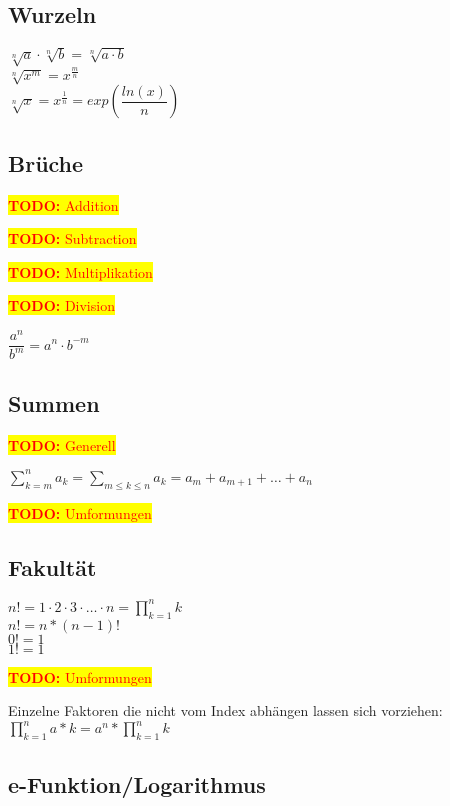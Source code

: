 \documentclass[10pt,a4paper]{article}
\newcommand{\todo}[1]{\begin{flushleft} \colorbox{yellow}{\textcolor{red}{\textbf{TODO:} {#1}}}\end{flushleft} }
\begin{document}
\subsection{Wurzeln}

$\sqrt[n]{a} \cdot \sqrt[n]{b} = \sqrt[n]{a \cdot b}  $ \\
$\sqrt[n]{x^{m}} = x^{\frac{m}{n}}  $ \\
$\sqrt[n]{x} = x^{\frac{1}{n}} = exp(\dfrac{ln(x)}{n})$

\subsection{Brüche}

\todo{Addition}
\todo{Subtraction}
\todo{Multiplikation}
\todo{Division}

$ \dfrac{a^{n}}{b^{m}} = a^{n} \cdot b^{-m}$

\subsection{Summen}

\todo{Generell}

$ \sum_{k=m}^{n}a_k = \sum_{m \leq k \leq n}a_k = a_m + a_{m+1} + \dots + a_n $

\todo{Umformungen}


\subsection{Fakultät}

$ n! = 1\cdot 2\cdot 3\cdot \dots\cdot n =  \prod \limits_{k=1}^{n}k $\\
$ n! = n * (n-1)!$\\
$ 0! = 1 $\\
$ 1! = 1 $\\

\todo{Umformungen}

Einzelne Faktoren die nicht vom Index abhängen lassen sich vorziehen:
$\prod \limits_{k=1}^{n} a* k  = a^n * \prod \limits_{k=1}^{n} k$




\subsection{e-Funktion/Logarithmus}
\end{document}
